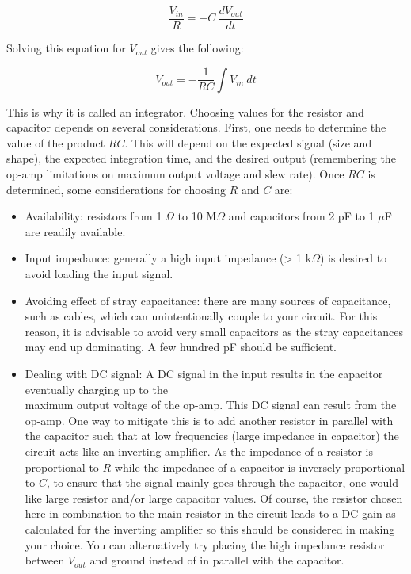 \documentclass[10pt]{PhysLab1C} %
\begin{document}
\[\frac{V_{in}}{R}=-C~\frac{dV_{out}}{dt}\]

Solving this equation for \(V_{out}\) gives the following:

\[V_{out}=-\frac{1}{RC}\int V_{in} ~dt\]

This is why it is called an integrator. Choosing values for the resistor
and capacitor depends on several considerations. First, one needs to
determine the value of the product \(RC\). This will depend on the
expected signal (size and shape), the expected integration time, and the
desired output (remembering the op-amp limitations on maximum output
voltage and slew rate). Once $RC$ is determined, some considerations for
choosing \(R\) and \(C\) are:

\begin{itemize}
\item
  Availability: resistors from 1 $\Omega$ to 10 M$\Omega$ and capacitors from 2 pF to
  1 $\mu$F are readily available.
\item
  Input impedance: generally a high input impedance (\textgreater{} 1
  k$\Omega$) is desired to avoid loading the input signal.
\item
  Avoiding effect of stray capacitance: there are many sources of
  capacitance, such as cables, which can unintentionally couple to your
  circuit. For this reason, it is advisable to avoid very small
  capacitors as the stray capacitances may end up dominating. A few
  hundred pF should be sufficient.
\item
  Dealing with DC signal: A DC signal in the input results in the
  capacitor eventually charging up to the\\
  maximum output voltage of the op-amp. This DC signal can result from
  the op-amp. One way to mitigate this is to add another resistor in
  parallel with the capacitor such that at low frequencies (large
  impedance in capacitor) the circuit acts like an inverting amplifier.
  As the impedance of a resistor is proportional to \(R\) while the
  impedance of a capacitor is inversely proportional to \(C\), to ensure
  that the signal mainly goes through the capacitor, one would like
  large resistor and/or large capacitor values. Of course, the resistor
  chosen here in combination to the main resistor in the circuit leads
  to a DC gain as calculated for the inverting amplifier so this should
  be considered in making your choice. You can alternatively try placing
  the high impedance resistor between \(V_{out}\) and ground instead of
  in parallel with the capacitor.
\end{itemize}
\end{document}
